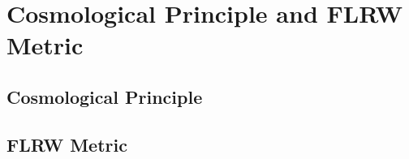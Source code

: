 \chapter{Cosmological Principle and FLRW Metric}

\section{Cosmological Principle}

\section{FLRW Metric}